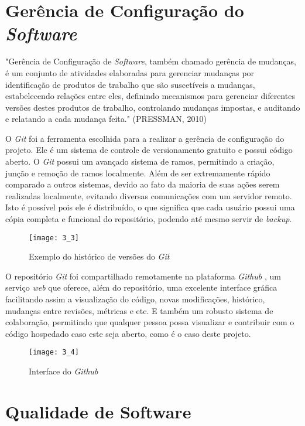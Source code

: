 \section{Gerência de Configuração do \textit{Software}}

"Gerência de Configuração de \textit{Software}, também chamado gerência de mudanças, é um conjunto de atividades elaboradas para gerenciar mudanças por identificação de produtos de trabalho que são suscetíveis a mudanças, estabelecendo relações entre eles, definindo mecanismos para gerenciar diferentes versões destes produtos de trabalho, controlando mudanças impostas, e auditando e relatando a cada mudança feita." (PRESSMAN, 2010)

O \textit{Git} \cite{website:git} foi a ferramenta escolhida para a realizar a gerência de configuração do projeto. Ele é um sistema de controle de versionamento gratuito e possui código aberto. O \textit{Git} possui um avançado sistema de ramos, permitindo a criação, junção e remoção de ramos localmente. Além de ser extremamente rápido comparado a outros sistemas, devido ao fato da maioria de suas ações serem realizadas localmente, evitando diversas comunicações com um servidor remoto. Isto é possível pois ele é distribuído, o que significa que cada usuário possui uma cópia completa e funcional do repositório, podendo até mesmo servir de \textit{backup}.

\begin{figure}[H]
    \centering
\texttt{[image: 3\_3]}
    \caption{Exemplo do histórico de versões do \textit{Git}}
    \label{figura3}
\end{figure}

O repositório \textit{Git} foi compartilhado remotamente na plataforma \textit{Github} \cite{website:github}, um serviço \textit{web} que oferece, além do repositório, uma excelente interface gráfica facilitando assim a visualização do código, novas modificações, histórico, mudanças entre revisões, métricas e etc. E também um robusto sistema de colaboração, permitindo que qualquer pessoa possa visualizar e contribuir com o código hospedado caso este seja aberto, como é o caso deste projeto.

\begin{figure}[H]
    \centering
\texttt{[image: 3\_4]}
    \caption{Interface do \textit{Github}}
    \label{figura4}
\end{figure}



\section{Qualidade de Software}

